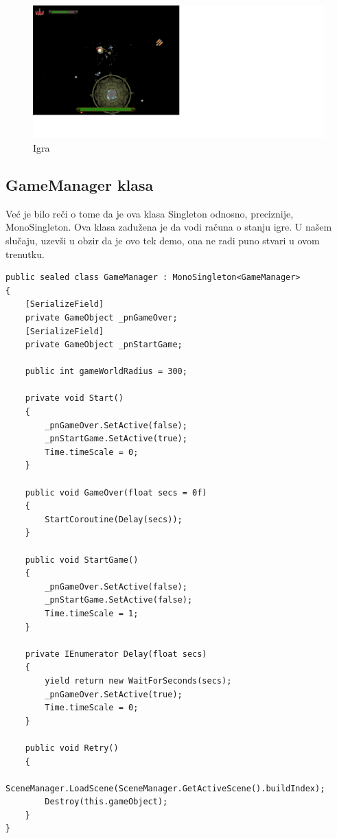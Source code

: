 \begin{center}
    \begin{figure}
        \includegraphics[width=2\textwidth]{Figures/GameScr_01.png}
        \caption{Igra}
        \label{fig:gamescr_01}
    \end{figure}
\end{center}


\subsection{GameManager klasa}
\label{gamemanager}
Ve\'c je bilo re\v{c}i o tome da je ova klasa Singleton odnosno, preciznije, MonoSingleton. Ova klasa zadu\v{z}ena je da
vodi ra\v{c}una o stanju igre. U na\v{s}em slu\v{c}aju, uzev\v{s}i u obzir da je ovo tek demo, ona ne radi puno stvari u ovom trenutku.

\begin{verbatim}
public sealed class GameManager : MonoSingleton<GameManager>
{
    [SerializeField]
    private GameObject _pnGameOver;
    [SerializeField]
    private GameObject _pnStartGame;

    public int gameWorldRadius = 300;

    private void Start()
    {
        _pnGameOver.SetActive(false);
        _pnStartGame.SetActive(true);
        Time.timeScale = 0;
    }

    public void GameOver(float secs = 0f)
    {
        StartCoroutine(Delay(secs));
    }

    public void StartGame()
    {
        _pnGameOver.SetActive(false);
        _pnStartGame.SetActive(false);
        Time.timeScale = 1;
    }

    private IEnumerator Delay(float secs)
    {
        yield return new WaitForSeconds(secs);
        _pnGameOver.SetActive(true);
        Time.timeScale = 0;
    }

    public void Retry()
    {
        SceneManager.LoadScene(SceneManager.GetActiveScene().buildIndex);
        Destroy(this.gameObject);
    }
}
\end{verbatim}

